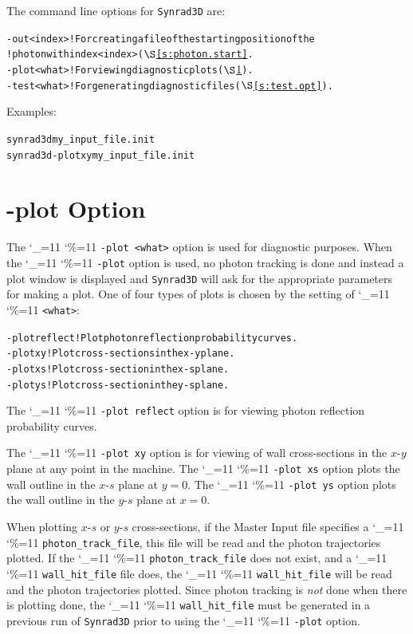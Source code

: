 \documentclass[11pt,openany]{report}
\newcommand{\sref}[1]{$\S$\ref{#1}}
\newcommand{\srthree}{\texttt{Synrad3D}\xspace}
\newcommand\ttcmd{\begingroup\catcode`\_=11 \catcode`\%=11 \dottcmd}
\newcommand\dottcmd[1]{\texttt{#1}\endgroup}
\newcommand{\vn}{\ttcmd}
\newlength{\ExBeg}
\newlength{\ExEnd}
\newenvironment{example}
  {\vspace{\ExBeg} \begin{alltt}}
  {\end{alltt} \vspace{\ExEnd}}
\begin{document}
The command line options for \srthree are:
\begin{example}
  -out <index>  ! For creating a file of the starting position of the
                !   photon with index <index> (\sref{s:photon.start}.
  -plot <what>  ! For viewing diagnostic plots (\sref{s:plot.opt}).
  -test <what>  ! For generating diagnostic files (\sref{s:test.opt}).
\end{example}

Examples:
\begin{example}
  synrad3d my_input_file.init
  synrad3d -plot xy  my_input_file.init
\end{example}

\section{-plot Option}
\label{s:plot.opt}

The \vn{-plot <what>} option is used for diagnostic purposes. When the
\vn{-plot} option is used, no photon tracking is done and instead a
plot window is displayed and \srthree will ask for the appropriate
parameters for making a plot. One of four types of plots is chosen by
the setting of \vn{<what>}:
\begin{example}
  -plot reflect ! Plot photon reflection probability curves.
  -plot xy      ! Plot cross-sections in the x-y plane.
  -plot xs      ! Plot cross-section in the x-s plane.
  -plot ys      ! Plot cross-section in the y-s plane.
\end{example}

The \vn{-plot reflect} option is for viewing photon reflection
probability curves. 

The \vn{-plot xy} option is for viewing of wall
cross-sections in the $x$-$y$ plane at any point in the machine. The
\vn{-plot xs} option plots the wall outline in the $x$-$s$ plane at $y
= 0$. The \vn{-plot ys} option plots the wall outline in the $y$-$s$
plane at $x = 0$. 

When plotting $x$-$s$ or $y$-$s$ cross-sections, if the Master Input file specifies a
\vn{photon_track_file}, this file will be read and the photon trajectories plotted.  If
the \vn{photon_track_file} does not exist, and a \vn{wall_hit_file} file does, the
\vn{wall_hit_file} will be read and the photon trajectories plotted. Since photon tracking
is {\em not} done when there is plotting done, the \vn{wall_hit_file} must be generated in
a previous run of \srthree prior to using the \vn{-plot} option.
\end{document}
